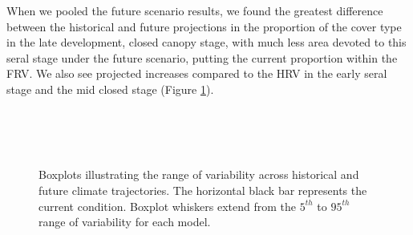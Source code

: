 When we pooled the future scenario results, we found the greatest difference between the historical and future projections in the proportion of the cover type in the late development, closed canopy stage, with much less area devoted to this seral stage under the future scenario, putting the current proportion within the FRV. We also see projected increases compared to the HRV in the early seral stage and the mid closed stage (Figure \ref{fig:covcond_rfrm}).

\begin{figure}[htbp]
  \centering
   \\
   \\
       \\
    \caption{Boxplots illustrating the range of variability across historical and future climate trajectories. The horizontal black bar represents the current condition. Boxplot whiskers extend from the $5^{th}$ to $95^{th}$ range of variability for each model. }
  \label{fig:covcond_rfrm}
\end{figure} %

